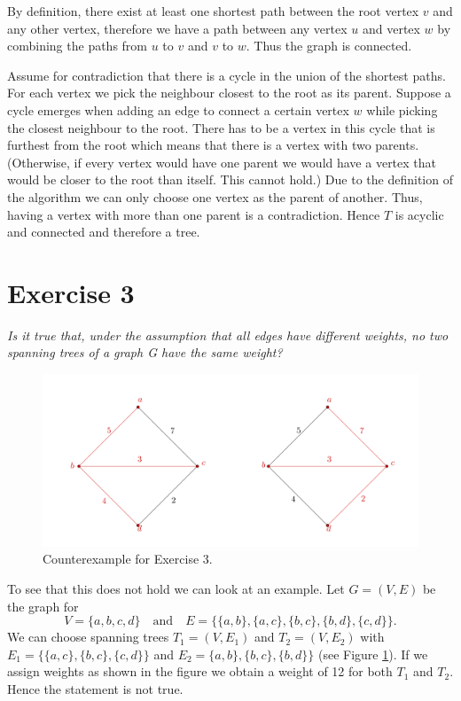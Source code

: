 \documentclass{article}
\begin{document}
By definition, there exist at least one shortest path between the root vertex $v$ and any other vertex, therefore we have a path between any vertex $u$ and vertex $w$ by combining the paths from $u$ to $v$ and $v$ to $w$. Thus the graph is connected.

Assume for contradiction that there is a cycle in the union of the shortest paths. For each vertex we pick the neighbour closest to the root as its parent. Suppose a cycle emerges when adding an edge to connect a certain vertex $w$ while picking the closest neighbour to the root. There has to be a vertex in this cycle that is furthest from the root which means that there is a vertex with two parents. (Otherwise, if every vertex would have one parent we would have a vertex that would be closer to the root than itself. This cannot hold.) Due to the definition of the algorithm we can only choose one vertex as the parent of another. 
Thus, having a vertex with more than one parent is a contradiction. Hence $T$ is acyclic and connected and therefore a tree.

\section*{Exercise 3}

\emph{Is it true that, under the assumption that all edges have different weights, no two spanning trees of a graph G have the same weight?}
\vspace{0.4cm}

\begin{figure}[h]
    \centering
    \includegraphics{Ex_3_project.png}
       \caption{Counterexample for Exercise 3.}
    \label{ex_3}
\end{figure}
To see that this does not hold we can look at an example. Let $G=(V,E)$ be the graph for
$$V = \{a,b,c,d\}\quad\text{and}\quad E = \{ \{a,b\}, \{a,c\}, \{b,c\}, \{b,d\}, \{c,d\} \}.$$ 
We can choose spanning trees $T_1 = (V, E_1)$ and $T_2 = (V, E_2)$ with $E_1 = \{ \{a,c\}, \{b,c\}, \{c,d\} \}$ and $E_2=\{a,b\}, \{b,c\}, \{b,d\} \}$ (see Figure \ref{ex_3}). If we assign weights as shown in the figure we obtain a weight of 12 for both $T_1$ and $T_2$. Hence the statement is not true.
\end{document}
